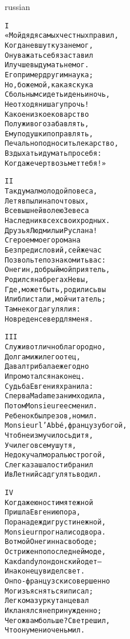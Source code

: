\documentclass[12pt,twocolumn]{article}
\begin{document}
\begin{center}
\begin{otherlanguage*}{russian}
\begin{minipage}[t]{\dimexpr 0.5\textwidth -\tabcolsep-.5pt}
\begin{alltt}\normalfont\centering
I
«Мой дядя самых честных правил,
Когда не в шутку занемог,
Он уважать себя заставил
И лучше выдумать не мог.
Его пример другим наука;
Но, боже мой, какая скука
С больным сидеть и день и ночь,
Не отходя ни шагу прочь!
Какое низкое коварство
Полуживого забавлять,
Ему подушки поправлять,
Печально подносить лекарство,
Вздыхать и думать про себя:
Когда же черт возьмет тебя!»
\end{alltt}
\end{minipage}

\begin{minipage}[t]{\dimexpr 0.5\textwidth -\tabcolsep-.5pt}
\begin{alltt}\normalfont\centering
II
Так думал молодой повеса,
Летя в пыли на почтовых,
Всевышней волею Зевеса
Наследник всех своих родных.
Друзья Людмилы и Руслана!
С героем моего романа
Без предисловий, сей же час
Позвольте познакомить вас:
Онегин, добрый мой приятель,
Родился на брегах Невы,
Где, может быть, родились вы
Или блистали, мой читатель;
Там некогда гулял и я:
Но вреден север для меня.
\end{alltt}
\end{minipage}
\clearpage

\begin{minipage}[t]{\dimexpr 0.5\textwidth -\tabcolsep-.5pt}
\begin{alltt}\normalfont\centering
III
Служив отлично благородно,
Долгами жил его отец,
Давал три бала ежегодно
И промотался наконец.
Судьба Евгения хранила:
Сперва Madame за ним ходила,
Потом Monsieur ее сменил.
Ребенок был резов, но мил.
Monsieur l'Abbé, француз убогой,
Чтоб не измучилось дитя,
Учил его всему шутя,
Не докучал моралью строгой,
Слегка за шалости бранил
И в Летний сад гулять водил.
\end{alltt}
\end{minipage}

\begin{minipage}[t]{\dimexpr 0.5\textwidth -\tabcolsep-.5pt}
\begin{alltt}\normalfont\centering
IV
Когда же юности мятежной
Пришла Евгению пора,
Пора надежд и грусти нежной,
Monsieur прогнали со двора.
Вот мой Онегин на свободе;
Острижен по последней моде,
Как dandy лондонский одет —
И наконец увидел свет.
Он по-французски совершенно
Мог изъясняться и писал;
Легко мазурку танцевал
И кланялся непринужденно;
Чего ж вам больше? Свет решил,
Что он умен и очень мил.
\end{alltt}
\end{minipage}
\clearpage


\end{otherlanguage*}
\end{center}
\end{document}
